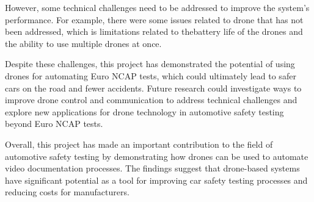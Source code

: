 However, some technical challenges need to be addressed to improve the system's performance. For example, there were some issues related to drone that has not been addressed, which is limitations related to thebattery life of the drones and the ability to use multiple drones at once. \newline

Despite these challenges, this project has demonstrated the potential of using drones for automating Euro NCAP tests, which could ultimately lead to safer cars on the road and fewer accidents. Future research could investigate ways to improve drone control and communication to address technical challenges and explore new applications for drone technology in automotive safety testing beyond Euro NCAP tests.\newline

Overall, this project has made an important contribution to the field of automotive safety testing by demonstrating how drones can be used to automate video documentation processes. The findings suggest that drone-based systems have significant potential as a tool for improving car safety testing processes and reducing costs for manufacturers.